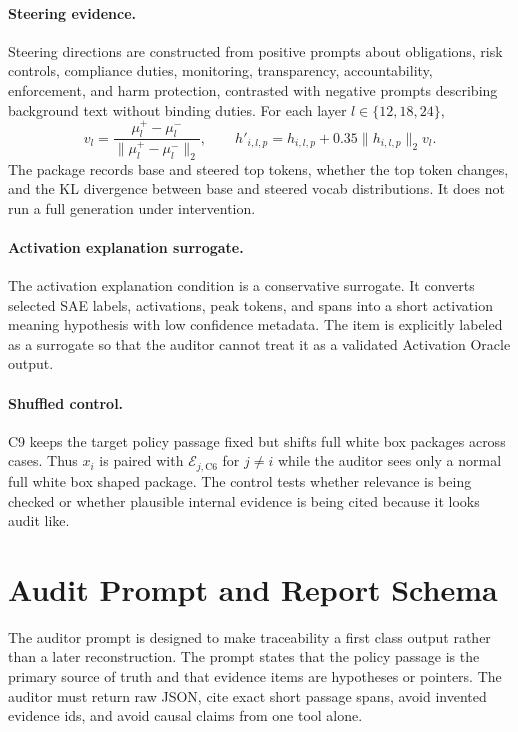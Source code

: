 \documentclass{article}
\newcommand{\package}{\mathcal{E}}
\begin{document}
\paragraph{Steering evidence.} Steering directions are constructed from positive prompts about obligations, risk controls, compliance duties, monitoring, transparency, accountability, enforcement, and harm protection, contrasted with negative prompts describing background text without binding duties. For each layer $l\in\{12,18,24\}$,
\begin{equation}
v_l=\frac{\mu_l^{+}-\mu_l^{-}}{\|\mu_l^{+}-\mu_l^{-}\|_2}, \qquad
h'_{i,l,p}=h_{i,l,p}+0.35\|h_{i,l,p}\|_2v_l.
\end{equation}
The package records base and steered top tokens, whether the top token changes, and the KL divergence between base and steered vocab distributions. It does not run a full generation under intervention.

\paragraph{Activation explanation surrogate.} The activation explanation condition is a conservative surrogate. It converts selected SAE labels, activations, peak tokens, and spans into a short activation meaning hypothesis with low confidence metadata. The item is explicitly labeled as a surrogate so that the auditor cannot treat it as a validated Activation Oracle output.

\paragraph{Shuffled control.} C9 keeps the target policy passage fixed but shifts full white box packages across cases. Thus $x_i$ is paired with $\package_{j,\mathrm{C6}}$ for $j\neq i$ while the auditor sees only a normal full white box shaped package. The control tests whether relevance is being checked or whether plausible internal evidence is being cited because it looks audit like.

\section{Audit Prompt and Report Schema}

The auditor prompt is designed to make traceability a first class output rather than a later reconstruction. The prompt states that the policy passage is the primary source of truth and that evidence items are hypotheses or pointers. The auditor must return raw JSON, cite exact short passage spans, avoid invented evidence ids, and avoid causal claims from one tool alone.
\end{document}
